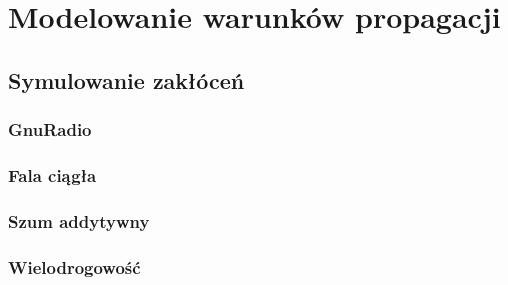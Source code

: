 \chapter{Modelowanie warunków propagacji}
\section{Symulowanie zakłóceń}
\subsection{GnuRadio}
\subsection{Fala ciągła}
\subsection{Szum addytywny}
\subsection{Wielodrogowość}
